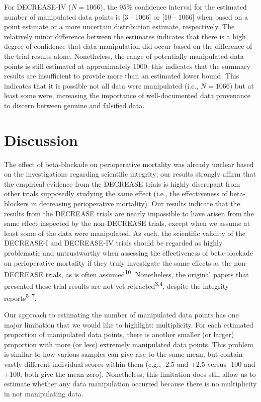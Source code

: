 \documentclass[]{article}
\begin{document}
For DECREASE-IV (\(N=1066\)), the 95\% confidence interval for the
estimated number of manipulated data points is {[}3 - 1066{]} or {[}10 -
1066{]} when based on a point estimate or a more uncertain distribution
estimate, respectively. The relatively minor difference between the
estimates indicates that there is a high degree of confidence that data
manipulation did occur based on the difference of the trial results
alone. Nonetheless, the range of potentially manipulated data points is
still estimated at approximately 1000; this indicates that the summary
results are insufficient to provide more than an estimated lower bound.
This indicates that it is possible not all data were manipulated (i.e.,
\(N=1066\)) but at least some were, increasing the importance of
well-documented data provenance to discern between genuine and falsified
data.

\section{Discussion}\label{discussion}

The effect of beta-blockade on perioperative mortality was already
unclear based on the investigations regarding scientific integrity; our
results strongly affirm that the empirical evidence from the DECREASE
trials is highly discrepant from other trials supposedly studying the
same effect (i.e., the effectiveness of beta-blockers in decreasing
perioperative mortality). Our results indicate that the results from the
DECREASE trials are nearly impossible to have arisen from the same
effect inspected by the non-DECREASE trials, except when we assume at
least some of the data were manipulated. As such, the scientific
validity of the DECREASE-I and DECREASE-IV trials should be regarded as
highly problematic and untrustworthy when assessing the effectiveness of
beta-blockade on perioperative mortality if they truly investigate the
same effects as the non-DECREASE trials, as is often
assumed\textsuperscript{10}. Nonetheless, the original papers that
presented these trial results are not yet
retracted\textsuperscript{3,4}, despite the integrity
reports\textsuperscript{5--7}.

Our approach to estimating the number of manipulated data points has one
major limitation that we would like to highlight: multiplicity. For each
estimated proportion of manipulated data points, there is another
smaller (or larger) proportion with more (or less) extremely manipulated
data points. This problem is similar to how various samples can give
rise to the same mean, but contain vastly different individual scores
within them (e.g., -2.5 and +2.5 versus -100 and +100; both give the
mean zero). Nonetheless, this limitation does still allow us to estimate
whether any data manipulation occurred because there is no multiplicity
in not manipulating data.
\end{document}
